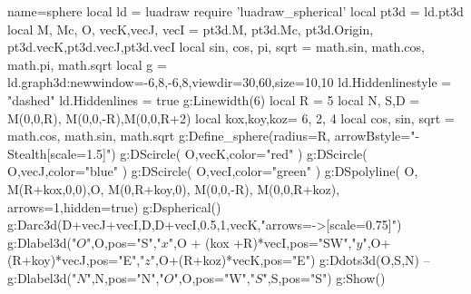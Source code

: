 \documentclass[12pt]{standalone}
\begin{document}
\begin{luadraw}{name=sphere}
local ld = luadraw
require 'luadraw_spherical'
local pt3d = ld.pt3d
local M, Mc, O, vecK,vecJ, vecI = pt3d.M, pt3d.Mc, pt3d.Origin,  pt3d.vecK,pt3d.vecJ,pt3d.vecI
local sin, cos, pi, sqrt = math.sin, math.cos, math.pi, math.sqrt
local g = ld.graph3d:new{window={-6,8,-6,8},viewdir={30,60},size={10,10}}
ld.Hiddenlinestyle = "dashed"
ld.Hiddenlines = true
g:Linewidth(6)
local R = 5
local N, S,D = M(0,0,R), M(0,0,-R),M(0,0,R+2)
 local kox,koy,koz= 6, 2, 4
local cos, sin, sqrt = math.cos, math.sin, math.sqrt
g:Define_sphere({radius=R, arrowBstyle="{-Stealth[scale=1.5]}"})
g:DScircle( {O,vecK},{color="red"} )
g:DScircle( {O,vecJ},{color="blue"} )
g:DScircle( {O,vecI},{color="green"} )
g:DSpolyline( {{O, M(R+kox,0,0)},{O, M(0,R+koy,0)},{ M(0,0,-R), M(0,0,R+koz)}}, {arrows=1,hidden=true})
g:Dspherical()
g:Darc3d(D+vecJ+vecI,D,D+vecI,0.5,1,vecK,"arrows={->[scale=0.75]}") 
g:Dlabel3d("$O$",O,{pos="S"},"$x$",O + (kox +R)*vecI,{pos="SW"},"$y$",O+(R+koy)*vecJ,{pos="E"},"$z$",O+(R+koz)*vecK,{pos="E"})
g:Ddots3d({O,S,N})
--g:Dlabel3d("$N$",N,{pos="N"},"$O$",O,{pos="W"},"$S$",S,{pos="S"})
g:Show()
\end{luadraw}
\end{document}

